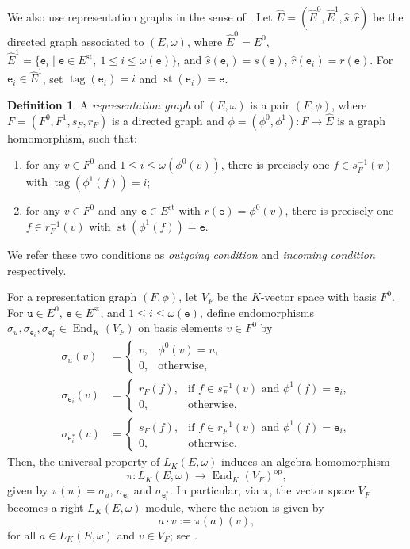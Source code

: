 \documentclass{article}
\theoremstyle{definition}
\newtheorem{definition}{Definition}
\begin{document}
We also use representation graphs in the sense of \cite{HPS}. Let $\widehat E=(\widehat E^0,\widehat E^1,\widehat s,\widehat r)$ be the directed graph associated to $(E,\omega)$, where $\widehat E^0=E^0$, $\widehat E^1=\{\mathtt{e}_i\mid \mathtt{e}\in E^{\mathrm{st}},\ 1\leq i\leq\omega(\mathtt{e})\}$, and $\widehat s(\mathtt{e}_i)=s(\mathtt{e})$, $\widehat r(\mathtt{e}_i)=r(\mathtt{e})$. For $\mathtt{e}_i\in\widehat E^1$, set $\operatorname{tag}(\mathtt{e}_i)=i$ and $\operatorname{st}(\mathtt{e}_i)=\mathtt{e}$.

\begin{definition}\label{definition_VF}
A \textit{representation graph} of $(E,\omega)$ is a pair $(F,\phi)$, where $F=(F^0,F^1,s_F,r_F)$ is a directed graph and $\phi=(\phi^0,\phi^1):F\to\widehat E$ is a graph homomorphism, such that:
\begin{enumerate}[label=\textup{(\arabic*)}]
\item for any $v\in F^0$ and $1\leq i\leq\omega(\phi^0(v))$, there is precisely one $f\in s_F^{-1}(v)$ with $\operatorname{tag}(\phi^1(f))=i$;
\item for any $v\in F^0$ and any $\mathtt{e}\in E^{\mathrm{st}}$ with $r(\mathtt{e})=\phi^0(v)$, there is precisely one $f\in r_F^{-1}(v)$ with $\operatorname{st}(\phi^1(f))=\mathtt{e}$.
\end{enumerate}
We refer these two conditions as \textit{outgoing condition} and \textit{incoming condition} respectively.
\end{definition}

For a representation graph $(F,\phi)$, let $V_F$ be the $K$-vector space with basis $F^0$. For $\mathtt{u}\in E^0$, $\mathtt e\in E^{\mathrm{st}}$, and $1\leq i\leq\omega(\mathtt e)$, define endomorphisms $\sigma_u,\sigma_{\mathtt e_i},\sigma_{\mathtt e_i^*}\in\operatorname{End}_K(V_F)$ on basis elements $v\in F^0$ by
$$
\begin{aligned}
\sigma_u(v)&=
\begin{cases}
v,&\phi^0(v)=u,\\
0,&\text{otherwise},
\end{cases}
\\[1ex]
\sigma_{\mathtt e_i}(v)&=
\begin{cases}
r_F(f),&\text{if }f\in s_F^{-1}(v)\text{ and }\phi^1(f)=\mathtt e_i,\\
0,&\text{otherwise},
\end{cases}
\\[1ex]
\sigma_{\mathtt e_i^*}(v)&=
\begin{cases}
s_F(f),&\text{if }f\in r_F^{-1}(v)\text{ and }\phi^1(f)=\mathtt e_i,\\
0,&\text{otherwise}.
\end{cases}
\end{aligned}
$$
Then, the universal property of $L_K(E,\omega)$ induces an algebra homomorphism
$$
\pi:L_K(E,\omega)\longrightarrow \operatorname{End}_K(V_F)^{\mathrm{op}},
$$
given by $\pi(u)=\sigma_u$, $\sigma_{\mathtt e_i}$ and $\sigma_{\mathtt e_i^*}$.
In particular, via $\pi$, the vector space $V_F$ becomes a right $L_K(E,\omega)$-module, where the action is given by
$$
a\cdot v := \pi(a)(v),
$$
for all $a\in L_K(E,\omega)$ and $v\in V_F$; see \cite[p.~168]{HPS}. 
\end{document}
